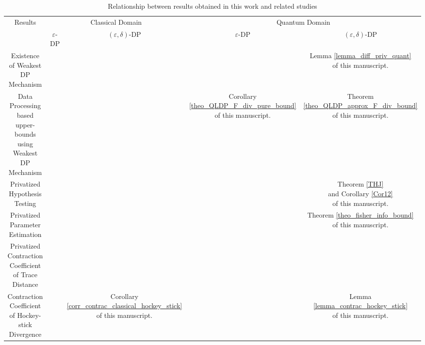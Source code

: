 \documentclass[onecolumn,ldraftcls, 11pt]{IEEEtran}
\newcommand{\RNum}[1]{\uppercase\expandafter{\romannumeral #1\relax}}
\newcommand{\eps}{\varepsilon}
\begin{document}
\begin{table}[h]
\caption{Relationship between results obtained in this work and related studies}\label{tab}
\begin{center}
\begin{tabular}{|c|c|c|c|c|}
\hline
 \multirow{2}{*}{Results} & \multicolumn{2}{|c|}{Classical Domain} & \multicolumn{2}{|c|}{Quantum Domain}\\
\cline{2-5} 
&{$\eps$-DP} & {$(\eps,\delta)$-DP} & {$\eps$-DP} & {$(\eps,\delta)$-DP}\\
 \hline
\makecell{Existence of Weakest \\ DP Mechanism} & \makecell{\cite[Theorem 5]{KOV15}} & \makecell{\cite[Theorem 18]{KOV15}} & \makecell{\cite[Theorem 2]{YH20}}  & \makecell{Lemma \ref{lemma_diff_priv_quant} \\ of this manuscript.}\\
\hline
\makecell{ Data Processing based\\ upper-bounds using Weakest\\ DP Mechanism} & {\makecell{\cite[Lemma D.8]{DRS22}}}  & & \makecell{ Corollary \ref{theo_QLDP_F_div_pure_bound} \\ of this manuscript.} & \makecell{Theorem \ref{theo_QLDP_approx_F_div_bound} \\ of this manuscript.} \\
\hline
\makecell{Privatized Hypothesis \\ Testing} 
&
\makecell{\cite[Theorem 18]{KOV15}}
 & 
\cite[Theorem 18]{KOV15}
& \makecell{\cite[Section \RNum{2}B]{YH20}} & \makecell{Theorem \ref{THJ} \\ and Corollary \ref{Cor12}\\ of this manuscript.}\\
\hline
\makecell{Privatized Parameter \\ Estimation} 
&
\makecell{\cite[Theorem 18]{KOV15}}
 & 
\cite[Theorem 18]{KOV15}
& \makecell{\cite[Section  \RNum{2}A]{YH20}} & \makecell{Theorem \ref{theo_fisher_info_bound} \\ of this manuscript.}\\
\hline
\makecell{Privatized Contraction\\  Coefficient of Trace Distance} & \cite[Corollary 11]{KOV15} & & \makecell{\cite[Theorem $2$]{Nuradha25}} & \makecell{\cite[Theorem $5$]{Nuradha25}}\\
\hline
\makecell{Contraction Coefficient\\ of Hockey-stick Divergence} & \makecell{\cite[Theorem 1]{ZA23}} & \makecell{Corollary \ref{corr_contrac_classical_hockey_stick} \\ of this manuscript.} & \makecell{\cite[Theorem 1]{Nuradha25}}  & \makecell{Lemma \ref{lemma_contrac_hockey_stick} \\ of this manuscript.} \\

\end{tabular}
\end{center}
\end{table}
\end{document}
